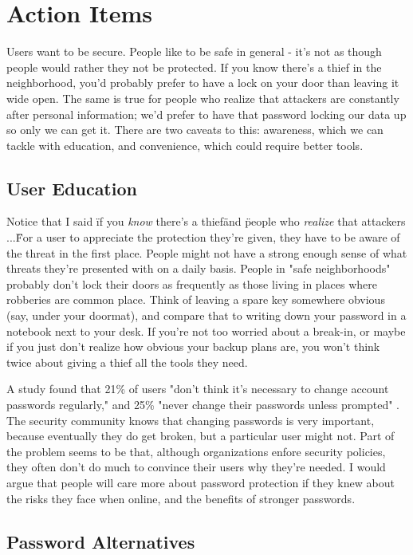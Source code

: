 \documentclass[12pt]{apa6}
\begin{document}
\section{Action Items}
Users want to be secure. People like to be safe in general - it's not as though people would rather they not be protected. If you know there's a thief in the neighborhood, you'd probably prefer to have a lock on your door than leaving it wide open. The same is true for people who realize that attackers are constantly after personal information; we'd prefer to have that password locking our data up so only we can get it. There are two caveats to this: awareness, which we can tackle with education, and convenience, which could require better tools.

\subsection{User Education}

Notice that I said \"if you \emph{know} there's a thief\" and \"people who \emph{realize} that attackers ...\" For a user to appreciate the protection they're given, they have to be aware of the threat in the first place. People might not have a strong enough sense of what threats they're presented with on a daily basis. People in "safe neighborhoods" probably don't lock their doors as frequently as those living in places where robberies are common place. Think of leaving a spare key somewhere obvious (say, under your doormat), and compare that to writing down your password in a notebook next to your desk. If you're not too worried about a break-in, or maybe if you just don't realize how obvious your backup plans are, you won't think twice about giving a thief all the tools they need.

A study found that 21\% of users "don't think it's necessary to change account passwords regularly," and 25\% "never change their passwords unless prompted" \parencite{mcafee11}. The security community knows that changing passwords is very important, because eventually they do get broken, but a particular user might not. Part of the problem seems to be that, although organizations enfore security policies, they often don't do much to convince their users why they're needed. I would argue that people will care more about password protection if they knew about the risks they face when online, and the benefits of stronger passwords.


\subsection{Password Alternatives}
\end{document}
